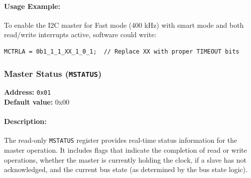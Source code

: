 \paragraph{Usage Example:}  
To enable the I2C master for Fast mode (400 kHz) with smart mode and both read/write interrupts active, software could write:
\begin{verbatim}
MCTRLA = 0b1_1_1_XX_1_0_1;  // Replace XX with proper TIMEOUT bits
\end{verbatim}

\vspace{2mm}

\subsubsection{Master Status (\texttt{MSTATUS})}
\label{sec:mstatus}

\textbf{Address:} \texttt{0x01} \\
\textbf{Default value:} 0x00

\paragraph{Description:}  
The read-only \texttt{MSTATUS} register provides real-time status information for the master operation. It includes flags that
indicate the completion of read or write operations, whether the master is currently holding the clock, if a slave has not
acknowledged, and the current bus state (as determined by the bus state logic).

